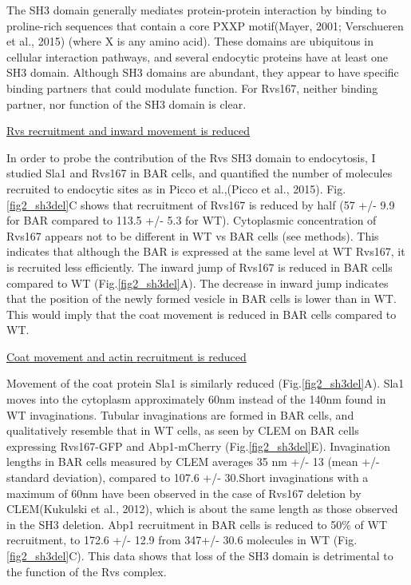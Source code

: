 	\vspace{5mm}
The SH3 domain generally mediates protein-protein interaction by binding to proline-rich sequences that contain a core PXXP motif(Mayer, 2001; Verschueren et al., 2015) (where X is any amino acid). These domains are ubiquitous in cellular interaction pathways, and several endocytic proteins have at least one SH3 domain. Although SH3 domains are abundant, they appear to have specific binding partners that could modulate function. For Rvs167, neither binding partner, nor function of the SH3 domain is clear. 


	\vspace{5mm}
\underline{Rvs recruitment and inward movement is reduced}

In order to probe the contribution of the Rvs SH3 domain to endocytosis, I studied Sla1 and Rvs167 in BAR cells, and quantified the number of molecules recruited to endocytic sites as in Picco et al.,(Picco et al., 2015). Fig.\ref{fig2_sh3del}C shows that recruitment of Rvs167 is reduced by half (57 +/- 9.9 for BAR compared to 113.5 +/- 5.3 for WT). Cytoplasmic concentration of Rvs167 appears not to be different in WT vs BAR cells (see methods). This indicates that although the BAR is expressed at the same level at WT Rvs167, it is recruited less efficiently. 
The inward jump of Rvs167 is reduced in BAR cells compared to WT (Fig.\ref{fig2_sh3del}A). The decrease in inward jump indicates that the position of the newly formed vesicle in BAR cells is lower than in WT. This would imply that the coat movement is reduced in BAR cells compared to WT.

	\vspace{5mm}
	\underline{Coat movement and actin recruitment is reduced}
	
Movement of the coat protein Sla1 is similarly reduced (Fig.\ref{fig2_sh3del}A). Sla1 moves into the cytoplasm approximately 60nm instead of the 140nm found in WT invaginations. Tubular invaginations are formed in BAR cells, and qualitatively resemble that in WT cells, as seen by CLEM on BAR cells expressing Rvs167-GFP and Abp1-mCherry (Fig.\ref{fig2_sh3del}E). Invagination lengths in BAR cells measured by CLEM averages 35 nm +/- 13 (mean +/- standard deviation), compared to 107.6 +/- 30.Short invaginations with a maximum of 60nm have been observed in the case of Rvs167 deletion by CLEM(Kukulski et al., 2012), which is about the same length as those observed in the SH3 deletion. 
Abp1 recruitment in BAR cells is reduced to 50\% of WT recruitment, to 172.6 +/- 12.9 from 347+/- 30.6 molecules in WT (Fig.\ref{fig2_sh3del}C). This data shows that loss of the SH3 domain is detrimental to the function of the Rvs complex. 


